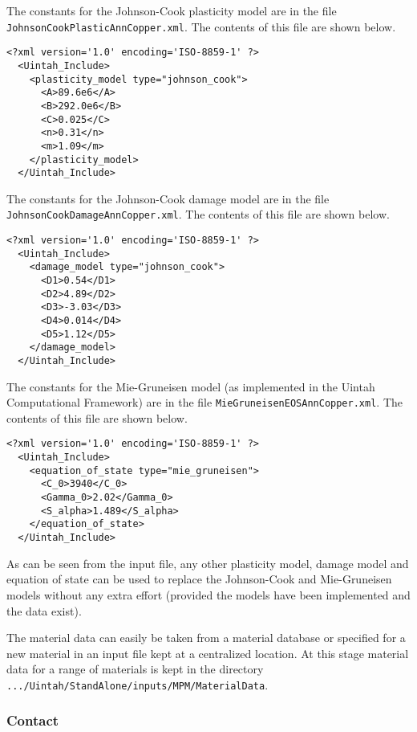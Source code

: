   The constants for the Johnson-Cook plasticity model are in the file
  \verb+JohnsonCookPlasticAnnCopper.xml+.  The contents of this file are
  shown below.
  \begin{Verbatim}[fontsize=\footnotesize]
  <?xml version='1.0' encoding='ISO-8859-1' ?>
  <Uintah_Include>
    <plasticity_model type="johnson_cook">
      <A>89.6e6</A>
      <B>292.0e6</B>
      <C>0.025</C>
      <n>0.31</n>
      <m>1.09</m>
    </plasticity_model>
  </Uintah_Include>
  \end{Verbatim}

  The constants for the Johnson-Cook damage model are in the file
  \verb+JohnsonCookDamageAnnCopper.xml+.  The contents of this file are
  shown below.
  \begin{Verbatim}[fontsize=\footnotesize]
  <?xml version='1.0' encoding='ISO-8859-1' ?>
  <Uintah_Include>
    <damage_model type="johnson_cook">
      <D1>0.54</D1>
      <D2>4.89</D2>
      <D3>-3.03</D3>
      <D4>0.014</D4>
      <D5>1.12</D5>
    </damage_model>
  </Uintah_Include>
  \end{Verbatim}

  The constants for the Mie-Gruneisen model (as implemented in the
  Uintah Computational Framework) are in the file
  \verb+MieGruneisenEOSAnnCopper.xml+.  The contents of this file are
  shown below.
  \begin{Verbatim}[fontsize=\footnotesize]
  <?xml version='1.0' encoding='ISO-8859-1' ?>
  <Uintah_Include>
    <equation_of_state type="mie_gruneisen">
      <C_0>3940</C_0>
      <Gamma_0>2.02</Gamma_0>
      <S_alpha>1.489</S_alpha>
    </equation_of_state>
  </Uintah_Include>
  \end{Verbatim}

  As can be seen from the input file, any other plasticity model, damage
  model and equation of state can be used to replace the Johnson-Cook
  and Mie-Gruneisen models without any extra effort (provided the models
  have been implemented and the data exist).

  The material data can easily be taken from a material database or specified
  for a new material in an input file kept at a centralized location.  At this
  stage material data for a range of materials is kept in the directory
  \verb|.../Uintah/StandAlone/inputs/MPM/MaterialData|.



\subsubsection{Contact}  \label{Contact}

